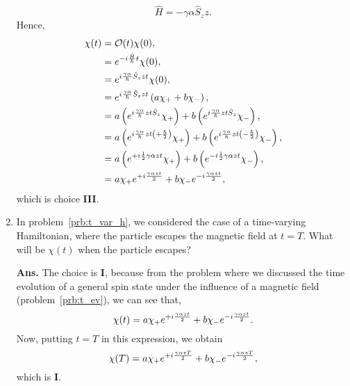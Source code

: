 \documentclass[12pt]{article}
\newcommand\half{\frac{1}{2}}
\newcommand\hs{\hat{S}}
\newcommand\tbf[1]{\textbf{#1}}
\newcommand\hhalf{\frac{\hbar}{2}}
\newcommand\tans{\tbf{Ans. }}
\newcommand\none{None of the above.}
\newcommand\h[1]{\hat{#1}}
\begin{document}
\begin{enumerate}[\bf 1.]
$$ \h{H} = - \gamma \alpha \hs_z z .$$
Hence,
$$
\begin{aligned}
\chi(t) &= \mathcal{O}(t) \chi ( 0 ),\\
		&= e ^ {-i {\h{H} \over \hbar}t} \chi(0),\\
		&= e ^ {i {\gamma \alpha \over \hbar} \hs_z z t} \chi(0), \\
		&= e ^ {i {\gamma \alpha \over \hbar} \hs_z z t} \left( a \chi_+ + b \chi_- \right), \\
		&= a \left(e ^ {i {\gamma \alpha \over \hbar} z t \hs_z} \chi_+ \right) + b \left(e ^ {i {\gamma \alpha \over \hbar} z t \hs_z} \chi_- \right),\\
		&= a \left(e ^ {i {\gamma \alpha \over \hbar} z t \left(+\hhalf\right)} \chi_+ \right) + b \left(e ^ {i {\gamma \alpha \over \hbar} z t \left(-\hhalf\right)} \chi_- \right), \\
		&= a \left(e ^ {+i \half {\gamma \alpha} z t} \chi_+ \right) + b \left(e ^ {-i \half {\gamma \alpha} z t} \chi_- \right), \\
		&= a \chi_+ e ^ {+i{{\gamma \alpha z t}\over{2}}} + b \chi_- e ^ {-i{{\gamma \alpha z t}\over{2}}},
\end{aligned}
$$
which is choice {\bf III}.
\vspace{1cm}
\item In problem~\ref{prb:t_var_h}, we considered the case of a time-varying Hamiltonian, where the particle escapes the magnetic field at $t=T$. What will be $\chi(t)$ when the particle escapes?
\vspace{0.5cm}
\tans The choice is {\bf I}, because from the problem where we discussed the time evolution of a general spin state under the influence of a magnetic field (problem~\ref{prb:t_ev}), we can see that,
$$
	\chi(t) = a \chi_+ e ^ {+i{{\gamma \alpha z t}\over{2}}} + b \chi_- e ^ {-i{{\gamma \alpha z t}\over{2}}}.
$$ 
Now, putting $t=T$ in this expression, we obtain $$\chi(T) = a \chi_+ e ^ {+i{{\gamma \alpha z T}\over{2}}} + b \chi_- e ^ {-i{{\gamma \alpha z T}\over{2}}},$$ which is {\bf I}. \newline %

\end{enumerate}
\end{document}
